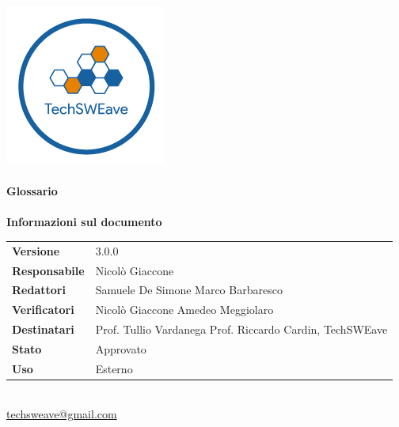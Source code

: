 \documentclass[a4paper]{article}
\begin{document}
\begin{titlepage}
    \begin{center}
        \includegraphics{../../../Images/logo}\\
        \vspace{20px}
        \textcolor{logo}{\hrulefill}\\
        \vspace{20px}
        \textbf{\huge\textcolor{logo}{Glossario}}\\
        \vspace{10px}
        \textcolor{logo}{\hrulefill}\\
        \vspace{40px}
        \textbf{\Large Informazioni sul documento}\\
        \vspace{20px}
        \begin{tabular}{p{100px} | p{100px}}
            \textbf{Versione}     & 3.0.0                                                                      \\
            \textbf{Responsabile} & Nicolò Giaccone                                                            \\
            \textbf{Redattori}    & Samuele De Simone \newline Marco Barbaresco                                \\
            \textbf{Verificatori} & Nicolò Giaccone \newline Amedeo Meggiolaro                                 \\
            \textbf{Destinatari}  & Prof. Tullio Vardanega \newline Prof. Riccardo Cardin, \newline TechSWEave \\
            \textbf{Stato}        & Approvato                                                                  \\
            \textbf{Uso}          & Esterno                                                                    \\
        \end{tabular}\\
        \vspace{60px}
        \href{mailto:techsweave@gmail.com}{techsweave@gmail.com}\\

    \end{center}
\end{titlepage}
\end{document}
